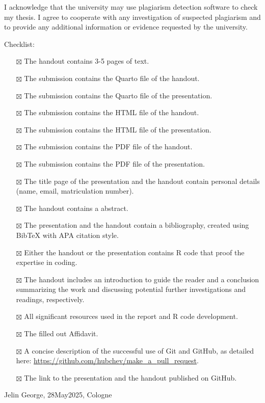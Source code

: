 \documentclass[
  man,
  floatsintext,
  longtable,
  nolmodern,
  notxfonts,
  notimes,
  colorlinks=true,linkcolor=blue,citecolor=blue,urlcolor=blue]{apa7}
\providecommand{\tightlist}{%
  \setlength{\itemsep}{0pt}\setlength{\parskip}{0pt}}
\begin{document}
I acknowledge that the university may use plagiarism detection software
to check my thesis. I agree to cooperate with any investigation of
suspected plagiarism and to provide any additional information or
evidence requested by the university.

Checklist:

\begin{itemize}
\tightlist
\item[$\boxtimes$]
  The handout contains 3-5 pages of text.
\item[$\boxtimes$]
  The submission contains the Quarto file of the handout.
\item[$\boxtimes$]
  The submission contains the Quarto file of the presentation.
\item[$\boxtimes$]
  The submission contains the HTML file of the handout.
\item[$\boxtimes$]
  The submission contains the HTML file of the presentation.
\item[$\boxtimes$]
  The submission contains the PDF file of the handout.
\item[$\boxtimes$]
  The submission contains the PDF file of the presentation.
\item[$\boxtimes$]
  The title page of the presentation and the handout contain personal
  details (name, email, matriculation number).
\item[$\boxtimes$]
  The handout contains a abstract.
\item[$\boxtimes$]
  The presentation and the handout contain a bibliography, created using
  BibTeX with APA citation style.
\item[$\boxtimes$]
  Either the handout or the presentation contains R code that proof the
  expertise in coding.
\item[$\boxtimes$]
  The handout includes an introduction to guide the reader and a
  conclusion summarizing the work and discussing potential further
  investigations and readings, respectively.
\item[$\boxtimes$]
  All significant resources used in the report and R code development.
\item[$\boxtimes$]
  The filled out Affidavit.
\item[$\boxtimes$]
  A concise description of the successful use of Git and GitHub, as
  detailed here: \url{https://github.com/hubchev/make_a_pull_request}.
\item[$\boxtimes$]
  The link to the presentation and the handout published on GitHub.
\end{itemize}

Jelin George, 28May2025, Cologne
\end{document}
